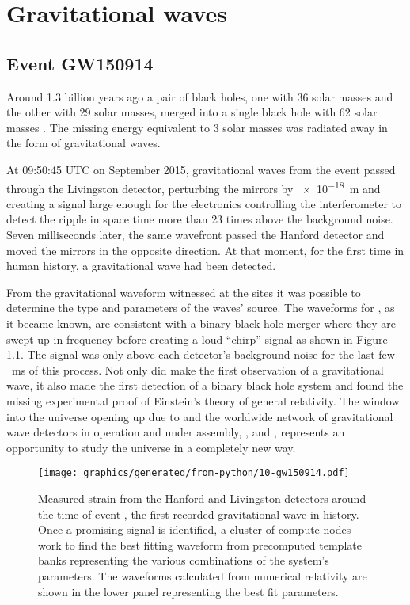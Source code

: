 \chapter{\label{c:gw-detection}Gravitational waves}

\section{Event GW150914}
Around \num{1.3} billion years ago a pair of black holes, one with \num{36} solar masses and the other with \num{29} solar masses, merged into a single black hole with \num{62} solar masses \cite{Abbott2016}. The missing energy equivalent to \num{3} solar masses was radiated away in the form of gravitational waves.

At 09:50:45 \gls{UTC} on  September 2015, gravitational waves from the event passed through the \LIGO{} Livingston detector, perturbing the mirrors by \SI{e-18}{\meter} and creating a signal large enough for the electronics controlling the interferometer to detect the ripple in space time more than \num{23} times above the background noise. Seven milliseconds later, the same wavefront passed the \LIGO{} Hanford detector and moved the mirrors in the opposite direction. At that moment, for the first time in human history, a gravitational wave had been detected.

From the gravitational waveform witnessed at the \LIGO{} sites it was possible to determine the type and parameters of the waves' source. The waveforms for \emph{\GWFIRSTEVENT{}}, as it became known, are consistent with a binary black hole merger where they are swept up in frequency before creating a loud ``chirp'' signal as shown in Figure\,\ref{fig:gw150914}. The signal was only above each detector's background noise for the last few \SI{}{\milli\second} of this process. Not only did \LIGO{} make the first observation of a gravitational wave, it also made the first detection of a binary black hole system and found the missing experimental proof of Einstein's theory of general relativity. The window into the universe opening up due to \LIGO{} and the worldwide network of gravitational wave detectors in operation and under assembly, \GEO{}, \VIRGO{} and \KAGRA{}, represents an opportunity to study the universe in a completely new way.

\begin{figure}
  \centering
  \texttt{[image: graphics/generated/from-python/10-gw150914.pdf]}
  \caption[Measured strain from the LIGO Hanford and Livingston detectors around the time of event \GWFIRSTEVENT{}]{\label{fig:gw150914}Measured strain from the \LIGO{} Hanford and Livingston detectors around the time of event \GWFIRSTEVENT{}, the first recorded gravitational wave in history. Once a promising signal is identified, a cluster of compute nodes work to find the best fitting waveform from precomputed template banks representing the various combinations of the system's parameters. The waveforms calculated from numerical relativity are shown in the lower panel representing the best fit parameters.}
\end{figure}

